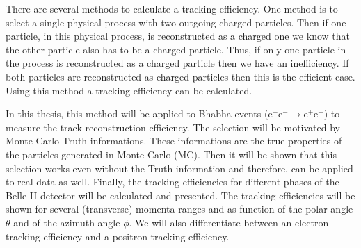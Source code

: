 \documentclass[a4paper,11pt,twosided,final,german,openbib,pdftex,listof=totoc,bibliography=totoc]{scrbook}
\begin{document}
There are several methods to calculate a tracking efficiency. One method is to select a single physical process with two outgoing charged particles. Then if one particle, in this physical process, is reconstructed as a charged one we know that the other particle also has to be a charged particle. Thus, if only one particle in the process is reconstructed as a charged particle then we have an inefficiency. If both particles are reconstructed as charged particles then this is the efficient case. Using this method a tracking efficiency can be calculated.
\newline
 


In this thesis, this method will be applied to Bhabha events ($\textrm{e}^+ \textrm{e}^- \rightarrow \textrm{e}^+\textrm{e}^-$) to measure the track reconstruction efficiency. The selection will be motivated by Monte Carlo-Truth informations. These informations are the true properties of the particles generated in Monte Carlo (MC). Then it will be shown that this selection works even without the Truth information and therefore, can be applied to real data as well. Finally, the tracking efficiencies for different phases of the Belle II detector will be calculated and presented. The tracking efficiencies will be shown for several (transverse) momenta ranges and as function of the polar angle $\theta$ and of the azimuth angle $\phi$. We will also differentiate between an electron tracking efficiency and a positron tracking efficiency.
\newline


\end{document}
